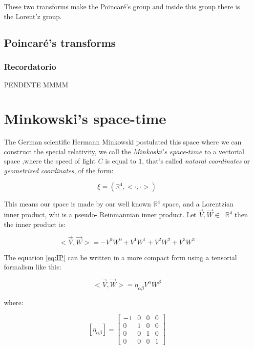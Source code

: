 \documentclass[spanish,notitlepage,letterpaper,11pt]{article} %
\begin{document}
These two transforms make the Poincaré's group and inside this group there is the Lorent'z group.

\subsection{Poincaré's transforms}
\subsubsection{Recordatorio}
PENDINTE MMMM

\section{Minkowski's space-time}

The German scientific Hermann Minkowski postulated this space where we can construct the special relativity, we call the $\textit{Minkoski's space-time}$ to a vectorial space ,where the speed of light $C$ is equal to $1$, that's called \textit{natural coordinates} or \textit{geometrized coordinates}, of the form:

\begin{equation*}
    \xi = (\mathbb{R}^4, <\cdot,\cdot>)
\end{equation*}

This means our space is made by our well known $\mathbb{R}^4$ space, and a Lorentzian inner product, whi is a pseudo- Reinmannian inner product. Let $\vec{V} , \vec{W}  \in \;\;\mathbb{R}^4$ then the inner product is:

\begin{equation}\label{eq:IP}
    <\vec{V},\vec{W}> = -V^0W^0 + V^1W^1 + V^2W^2 + V^3W^3
\end{equation}

The equation \ref{eq:IP} can be written in a more compact form using a tensorial formalism like this:

\begin{equation}\label{eq:IPT}
    <\vec{V},\vec{W}> = \eta_{\alpha\beta}V^{\alpha}W^{\beta}
\end{equation}

where:

\begin{equation}\label{eq:metric}
    [\eta_{\alpha\beta}] = 
    \begin{bmatrix}
    -1 & 0 & 0 & 0 \\
    0 & 1 & 0 & 0 \\
    0 & 0 & 1 & 0 \\
    0 & 0 & 0 & 1
    \end{bmatrix}
\end{equation}
\end{document}
